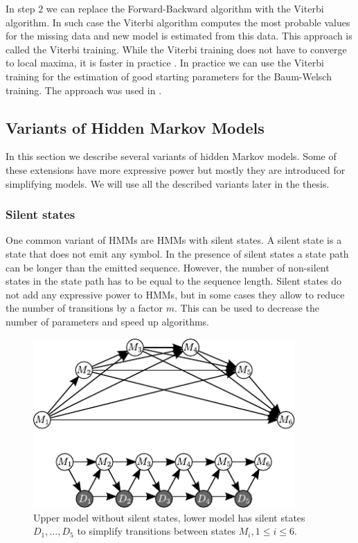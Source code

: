 In step $2$ we can replace the Forward-Backward algorithm with the Viterbi
algorithm. In such case the Viterbi algorithm computes the most probable values
for the missing data and new model is estimated from this data.
This approach is called the Viterbi training.  While the Viterbi training does
not have to converge to local maxima, it is faster in practice
\cite{Durbin1998}.  In practice we can use the Viterbi training for the
estimation of good starting parameters for the Baum-Welsch training. The
approach was used in \cite{FEAST2011}.

\subsection{Variants of Hidden Markov Models}

In this section we describe several variants of hidden Markov models.  Some of
these extensions have more expressive power but mostly they are introduced for
simplifying  models. We will use all the described variants later in the
thesis.

\subsubsection{Silent states}
\label{SECTION:SILENT}
One common variant of HMMs are HMMs with silent states. A silent state is a state
that does not emit any symbol. In the presence of silent states a state path can
be longer than the emitted sequence. However, the number of non-silent states in
the state path has to be equal to the sequence length. Silent states do not
add any expressive power to HMMs, but in some cases they allow to reduce the
number of transitions by a factor $m$. This can be used to decrease the number of
parameters and speed up algorithms. 

\begin{figure}
\begin{center}
\includegraphics[width=10cm]{../figures/silent_removal.pdf}
\end{center}
\caption[Removal of silent state]{
Upper model without silent states, lower model has silent states $D_1, \dots, D_5$ to simplify 
transitions between states $M_i, 1\leq i\leq 6$.
}\label{FIGURE:SILENTREMOVE}
\end{figure}

